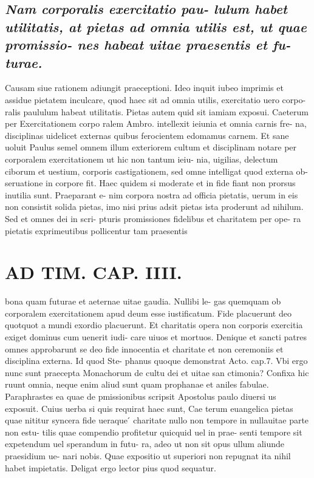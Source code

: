 \documentclass{article}
\begin{document}
\begin{pages}
\subsection*{\textit{Nam corporalis exercitatio pau- lulum habet utilitatis, at pietas ad omnia utilis est, ut quae promissio- nes habeat uitae praesentis et fu- turae. }}\pstart Causam siue rationem adiungit praeceptioni. Ideo inquit iubeo imprimis et assidue pietatem inculcare, quod haec sit ad omnia utilis, exercitatio uero corpo- ralis paululum habeat utilitatis. Pietas autem quid sit iamiam exposui. Caeterum per Exercitationem corpo ralem Ambro. intellexit ieiunia et omnia carnis fre- na, disciplinas uidelicet externas quibus ferocientem edomamus carnem. Et sane uoluit Paulus semel omnem illum exteriorem cultum et disciplinam notare per corporalem exercitationem ut hic non tantum ieiu- nia, uigilias, delectum ciborum et uestium, corporis castigationem, sed omne intelligat quod externa ob- seruatione in corpore fit. Haec quidem si moderate et in fide fiant non prorsus inutilia sunt. Praeparant e- nim corpora nostra ad officia pietatis, uerum in eis non consistit solida pietas, imo nisi prius adsit pietas ista proderunt ad nihilum. Sed et omnes dei in scri- pturis promissiones fidelibus et charitatem per ope- ra pietatis exprimeutibus pollicentur tam praesentis  \pend
\section*{AD TIM. CAP. IIII. }
\marginpar{[ p.143 ]}\pstart bona quam futurae et aeternae uitae gaudia. Nullibi le- gas quemquam ob corporalem exercitationem apud deum esse iustificatum. Fide placuerunt deo quotquot a mundi exordio placuerunt. Et charitatis opera non corporis exercitia exiget dominus cum uenerit iudi- care uiuos et mortuos. Denique et sancti patres omnes approbarunt se deo fide innocentia et charitate et non ceremoniis et disciplina externa. Id quod Ste- phanus quoque demonstrat Acto. cap.7. Vbi ergo nunc sunt praecepta Monachorum de cultu dei et uitae san ctimonia? Confixa hic ruunt omnia, neque enim aliud sunt quam prophanae et aniles fabulae. Paraphrastes ea quae de pmissionibus scripsit Apostolus paulo diuersi us exposuit. Cuius uerba si quis requirat haec sunt, Cae terum euangelica pietas quae nititur syncera fide ueraque ́ charitate nullo non tempore in nullauitae parte non estu- tilis quae compendio profitetur quicquid uel in prae- senti tempore sit expetendum uel sperandum in futu- ra, adeo ut non sit opus ullum aliunde praesidium ue- nari nobis. Quae expositio ut superiori non repugnat ita nihil habet impietatis. Deligat ergo lector pius quod sequatur.  \pend
{}
{}

\end{pages}
\end{document}

